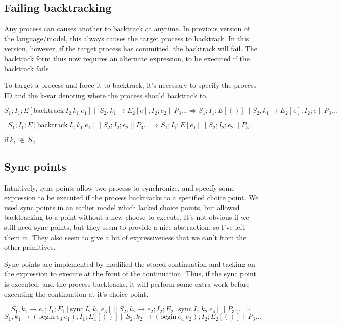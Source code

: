 \documentclass[11pt]{article}
\begin{document}
\subsection{Failing backtracking}
Any process can causes another to backtrack at anytime. In previous
version of the language/model, this always causes the target process to
backtrack. In this version, however, if the target process has
committed, the backtrack will fail. The backtrack form thus now requires 
an alternate expression, to be executed if the backtrack fails.

To target a process and force it to backtrack, it's necessary to specify
the process ID and the k-var denoting where the process should backtrack
to.

$$
S_1;I_1;E[\text{backtrack}~I_2~k_1~e_1] \parallel S_2,k_1 \to
E_2[e];I_2;e_2
\parallel P_3 \dots
\Rightarrow S_1;I_1;E[()] \parallel S_2,k_1 \to E_2[e];I_2;e \parallel
P_3 \dots$$

$$S_1;I_1;E[\text{backtrack}~I_2~k_1~e_1] \parallel S_2;I_2;e_2
\parallel P_3 \dots
\Rightarrow S_1;I_1;E[e_1] \parallel S_2;I_2;e_2 \parallel P_3 \dots$$

$\text{if}~k_1~\not\in~S_2$

\subsection{Sync points}
Intuitively, sync points allow two process to synchronize, and specify
some expression to be executed if the process backtracks to a specified
choice point. We used sync points in an earlier model which lacked
choice points, but allowed backtracking to a point without a new choose
to execute. It's not obvious if we still need sync points, but they seem
to provide a nice abstraction, so I've left them in. They also seem to
give a bit of expressiveness that we can't from the other primitives.

Sync points are implemented by modified the stored continuation and
tacking on the expression to execute at the front of the continuation.
Thus, if the sync point is executed, and the process backtracks, it will
perform some extra work before executing the continuation at it's choice
point.

$$
S_1,k_1 \to e_1;I_1;E_1[\text{sync}~I_2~k_1~e_3] \parallel 
S_2,k_2 \to e_2;I_2;E_2[\text{sync}~I_1~k_2~e_4] \parallel P_3 \dots
\Rightarrow $$$
S_1,k_1 \to (\text{begin}~e_3~e_1);I_1;E_1[()] \parallel 
S_2,k_2 \to (\text{begin}~e_4~e_2);I_2;E_2[()] \parallel P_3 \dots
$
\end{document}
